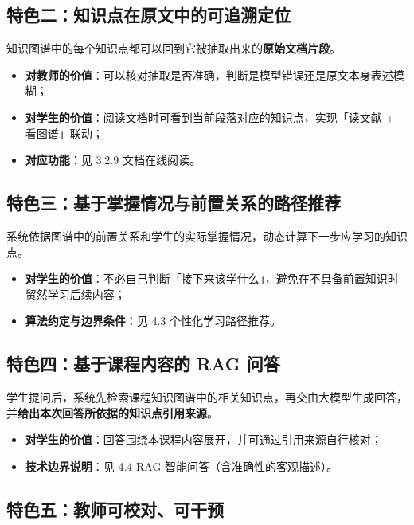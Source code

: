\documentclass[UTF8,a4paper,11pt]{ctexrep}
\begin{document}
\subsection{特色二：知识点在原文中的可追溯定位}

知识图谱中的每个知识点都可以回到它被抽取出来的\textbf{原始文档片段}。

\begin{itemize}
\item \textbf{对教师的价值}：可以核对抽取是否准确，判断是模型错误还是原文本身表述模糊；
\item \textbf{对学生的价值}：阅读文档时可看到当前段落对应的知识点，实现「读文献 + 看图谱」联动；
\item \textbf{对应功能}：见 3.2.9 文档在线阅读。
\end{itemize}

\subsection{特色三：基于掌握情况与前置关系的路径推荐}

系统依据图谱中的前置关系和学生的实际掌握情况，动态计算下一步应学习的知识点。

\begin{itemize}
\item \textbf{对学生的价值}：不必自己判断「接下来该学什么」，避免在不具备前置知识时贸然学习后续内容；
\item \textbf{算法约定与边界条件}：见 4.3 个性化学习路径推荐。
\end{itemize}

\subsection{特色四：基于课程内容的 RAG 问答}

学生提问后，系统先检索课程知识图谱中的相关知识点，再交由大模型生成回答，并\textbf{给出本次回答所依据的知识点引用来源}。

\begin{itemize}
\item \textbf{对学生的价值}：回答围绕本课程内容展开，并可通过引用来源自行核对；
\item \textbf{技术边界说明}：见 4.4 RAG 智能问答（含准确性的客观描述）。
\end{itemize}

\subsection{特色五：教师可校对、可干预}
\end{document}
